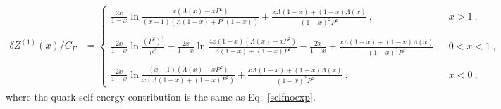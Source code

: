 \begin{align}\label{transvertexnoexp}
\delta  Z^{(1)}(x)/C_F&=\left\{ \begin{array} {ll} \frac{2x}{1-x}\ln \frac{x(\Lambda(x)-xP^z)}{(x-1)(\Lambda(1-x)+P^z(1-x))}+\frac{x\Lambda(1-x)+(1-x)\Lambda(x)}{(1-x)^2 P^z}\ , & x>1\ , \\
\ \\
\frac{2x}{1-x}\ln\frac{(P^z)^2}{\mu^2}+\frac{2x}{1-x}\ln \frac{4x(1-x)(\Lambda(x)-x P^z)}{\Lambda(1-x)+(1-x)P^z}-\frac{2x}{1-x}+\frac{x\Lambda(1-x)+(1-x)\Lambda(x)}{(1-x)^2 P^z}\ , & 0<x<1\ , \\
\ \\
\frac{2x}{1-x}\ln \frac{(x-1)(\Lambda(x)-x P^z)}{x(\Lambda(1-x)+(1-x)P^z)}+\frac{x\Lambda(1-x)+(1-x)\Lambda(x)}{(1-x)^2P^z}\ , & x<0\ , \end{array} \right.
\end{align}
% 
where the quark self-energy contribution is the same as Eq.~\ref{selfnoexp}.
